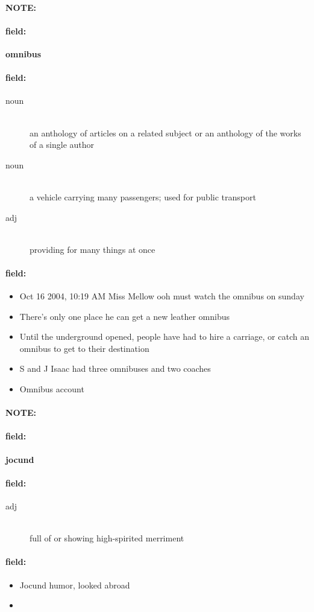 \documentclass[12pt]{article}
\newenvironment{note}{\paragraph{NOTE:}}{}
\newenvironment{field}{\paragraph{field:}}{}
\begin{document}
\begin{note}
\begin{field}
\textbf{\large omnibus}
\end{field}


\begin{field}
\begin{description}
\item[noun] \hfill \\ 
an anthology of articles on a related subject or an anthology of the works of a single author

\item[noun] \hfill \\ 
a vehicle carrying many passengers; used for public transport

\item[adj] \hfill \\ 
providing for many things at once

\end{description}
\end{field}

\begin{field}
\begin{itemize}
\item Oct 16 2004, 10:19 AM Miss Mellow ooh must watch the omnibus on sunday
\item There's only one place he can get a new leather omnibus
\item Until the underground opened, people have had to hire a carriage, or catch an omnibus to get to their destination
\item  S and J Isaac had three omnibuses and two coaches
\item Omnibus account
\end{itemize}
\end{field}
\end{note}
\begin{note}
\begin{field}
\textbf{\large jocund}
\end{field}


\begin{field}
\begin{description}
\item[adj] \hfill \\ 
full of or showing high-spirited merriment

\end{description}
\end{field}

\begin{field}
\begin{itemize}
\item Jocund humor, looked abroad
\item 
\end{itemize}
\end{field}
\end{note}
\end{document}
